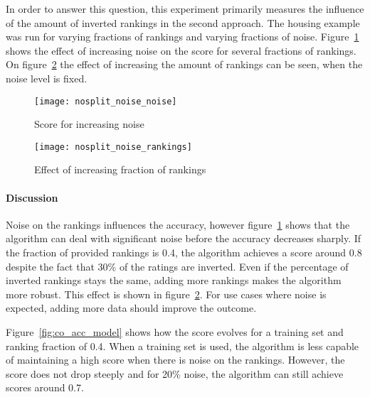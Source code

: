\begin{experiment}
	In order to answer this question, this experiment primarily measures the influence of the amount of inverted rankings in the second approach.
	The housing example was run for varying fractions of rankings and varying fractions of noise.
	Figure~\ref{fig:nosplit_noise_noise} shows the effect of increasing noise on the score for several fractions of rankings.
	On figure~\ref{fig:nosplit_noise_rankings} the effect of increasing the amount of rankings can be seen, when the noise level is fixed.

	\begin{figure}

		\caption{Score for increasing noise}
		\centering
			\texttt{[image: nosplit\_noise\_noise]}
		\label{fig:nosplit_noise_noise}

	\end{figure}

	\begin{figure}

		\caption{Effect of increasing fraction of rankings}
		\centering
			\texttt{[image: nosplit\_noise\_rankings]}
		\label{fig:nosplit_noise_rankings}

	\end{figure}

\end{experiment}

\paragraph{Discussion}
Noise on the rankings influences the accuracy, however figure~\ref{fig:nosplit_noise_noise} shows that the algorithm can deal with significant noise before the accuracy decreases sharply.
If the fraction of provided rankings is 0.4, the algorithm achieves a score around 0.8 despite the fact that 30\% of the ratings are inverted. 
Even if the percentage of inverted rankings stays the same, adding more rankings makes the algorithm more robust.
This effect is shown in figure~\ref{fig:nosplit_noise_rankings}.
For use cases where noise is expected, adding more data should improve the outcome.

Figure~\ref{fig:co_acc_model} shows how the score evolves for a training set and ranking fraction of 0.4.  
When a training set is used, the algorithm is less capable of maintaining a high score when there is noise on the rankings.
However, the score does not drop steeply and for 20\% noise, the algorithm can still achieve scores around 0.7.

